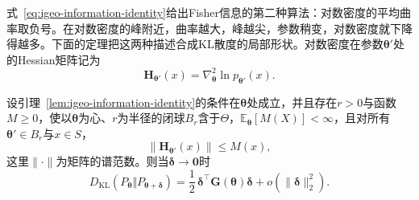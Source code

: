 式~\eqref{eq:igeo-information-identity}给出Fisher信息的第二种算法：对数密度的平均曲率取负号。在对数密度的峰附近，曲率越大，峰越尖，参数稍变，对数密度就下降得越多。下面的定理把这两种描述合成KL散度的局部形状。对数密度在参数$\bm{\theta}'$处的Hessian矩阵记为
\[
  \bm{H}_{\bm{\theta}'}(x)=\nabla_{\bm{\theta}}^{2}\ln p_{\bm{\theta}'}(x).
\]

\begin{theorem}[KL散度的二阶展开]
\label{thm:igeo-kl-expansion}
设引理~\ref{lem:igeo-information-identity}的条件在$\bm{\theta}$处成立，并且存在$r>0$与函数$M\geq0$，使以$\bm{\theta}$为心、$r$为半径的闭球$B_r$含于$\Theta$，$\mathbb{E}_{\bm{\theta}}[M(X)]<\infty$，且对所有$\bm{\theta}'\in B_r$与$x\in S$，
\begin{equation}
  \lVert\bm{H}_{\bm{\theta}'}(x)\rVert\leq M(x),
  \label{eq:igeo-hessian-control}
\end{equation}
这里$\lVert\cdot\rVert$为矩阵的谱范数。则当$\bm{\delta}\to\bm{0}$时
\begin{equation}
  D_{\mathrm{KL}}(P_{\bm{\theta}}\Vert P_{\bm{\theta}+\bm{\delta}})=\frac12\,\bm{\delta}^{\top}\bm{G}(\bm{\theta})\bm{\delta}+o(\lVert\bm{\delta}\rVert_2^{2}).
  \label{eq:igeo-kl-expansion}
\end{equation}
\end{theorem}

